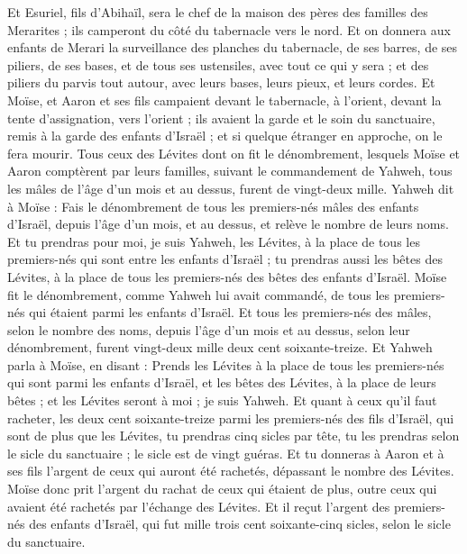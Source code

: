 \begin{multicols}{2}
Et Esuriel, fils d'Abihaïl, sera le chef de la maison des pères des familles des Merarites ; ils camperont du côté du tabernacle vers le nord.
Et on donnera aux enfants de Merari la surveillance des planches du tabernacle, de ses barres, de ses piliers, de ses bases, et de tous ses ustensiles, avec tout ce qui y sera ;
et des piliers du parvis tout autour, avec leurs bases, leurs pieux, et leurs cordes.
Et Moïse, et Aaron et ses fils campaient devant le tabernacle, à l'orient, devant la tente d'assignation, vers l'orient ; ils avaient la garde et le soin du sanctuaire, remis à la garde des enfants d'Israël ; et si quelque étranger en approche, on le fera mourir.
Tous ceux des Lévites dont on fit le dénombrement, lesquels Moïse et Aaron comptèrent par leurs familles, suivant le commandement de Yahweh, tous les mâles de l'âge d'un mois et au dessus, furent de vingt-deux mille.
Yahweh dit à Moïse : Fais le dénombrement de tous les premiers-nés mâles des enfants d'Israël, depuis l'âge d'un mois, et au dessus, et relève le nombre de leurs noms.
Et tu prendras pour moi, je suis Yahweh, les Lévites, à la place de tous les premiers-nés qui sont entre les enfants d'Israël ; tu prendras aussi les bêtes des Lévites, à la place de tous les premiers-nés des bêtes des enfants d'Israël.
Moïse fit le dénombrement, comme Yahweh lui avait commandé, de tous les premiers-nés qui étaient parmi les enfants d'Israël.
Et tous les premiers-nés des mâles, selon le nombre des noms, depuis l'âge d'un mois et au dessus, selon leur dénombrement, furent vingt-deux mille deux cent soixante-treize.
Et Yahweh parla à Moïse, en disant :
Prends les Lévites à la place de tous les premiers-nés qui sont parmi les enfants d'Israël, et les bêtes des Lévites, à la place de leurs bêtes ; et les Lévites seront à moi ; je suis Yahweh.
Et quant à ceux qu'il faut racheter, les deux cent soixante-treize parmi les premiers-nés des fils d'Israël, qui sont de plus que les Lévites,
tu prendras cinq sicles par tête, tu les prendras selon le sicle du sanctuaire ; le sicle est de vingt guéras.
Et tu donneras à Aaron et à ses fils l'argent de ceux qui auront été rachetés, dépassant le nombre des Lévites.
Moïse donc prit l'argent du rachat de ceux qui étaient de plus, outre ceux qui avaient été rachetés par l'échange des Lévites.
Et il reçut l'argent des premiers-nés des enfants d'Israël, qui fut mille trois cent soixante-cinq sicles, selon le sicle du sanctuaire.

\end{multicols}
